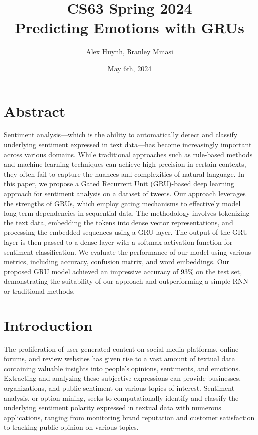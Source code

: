 \documentclass[11pt]{article}
\title{CS63 Spring 2024\\Predicting Emotions with GRUs}
\author{Alex Huynh, Branley Mmasi}
\date{May 6th, 2024}
\begin{document}
\maketitle

\section{Abstract}

Sentiment analysis—which is the ability to automatically detect and classify underlying sentiment expressed in text data—has become increasingly important across various domains. While traditional approaches such as rule-based methods and machine learning techniques can achieve high precision in certain contexts, they often fail to capture the nuances and complexities of natural language. In this paper, we propose a Gated Recurrent Unit (GRU)-based deep learning approach for sentiment analysis on a dataset of tweets. Our approach leverages the strengths of GRUs, which employ gating mechanisms to effectively model long-term dependencies in sequential data. The methodology involves tokenizing the text data, embedding the tokens into dense vector representations, and processing the embedded sequences using a GRU layer. The output of the GRU layer is then passed to a dense layer with a softmax activation function for sentiment classification. We evaluate the performance of our model using various metrics, including accuracy, confusion matrix, and word embeddings. Our proposed GRU model achieved an impressive accuracy of 93\% on the test set, demonstrating the suitability of our approach and outperforming a simple RNN or traditional methods. 

\section{Introduction}

The proliferation of user-generated content on social media platforms, online forums, and review websites has given rise to a vast amount of textual data containing valuable insights into people’s opinions, sentiments, and emotions. Extracting and analyzing these subjective expressions can provide businesses, organizations, and public sentiment on various topics of interest. Sentiment analysis, or option mining, seeks to computationally identify and classify the underlying sentiment polarity expressed in textual data with numerous applications, ranging from monitoring brand reputation and customer satisfaction to tracking public opinion on various topics.
\end{document}
